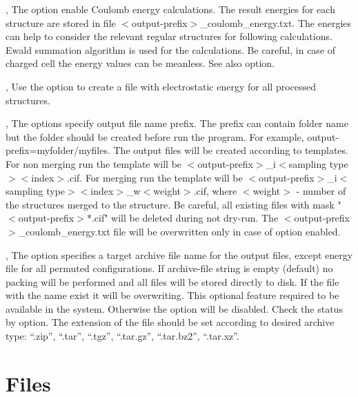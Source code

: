 \documentclass[a4paper,english]{article}
\begin{document}
\begin{Description}
\item[\Opt{-q}, \Opt{\Dd coulomb-energy}] 
      The option enable Coulomb energy calculations. The result energies for each structure are stored in file $<$output-prefix$>$\_coulomb\_energy.txt. The energies can help to consider the relevant regular structures for following calculations. Ewald summation algorithm is used for the calculations. Be careful, in case of charged cell the energy values can be meanless. See also  option.

\item[\Opt{-g}, \Opt{\Dd coulomb-store}]
      Use the option to create a file with electrostatic energy for all processed structures.

\item[\OptArg{-o }{output-prefix}, \OptArg{\Dd output-prefix=}{output-prefix}]
      The options specify output file name prefix. The prefix can contain folder name but the folder should be created before run the program. For example, \Dd output-prefix=myfolder/myfiles. The output files will be created according to templates. For non merging run the template will be $<$output-prefix$>$\_i$<$sampling type$><$index$>$.cif. For merging run the template will be $<$output-prefix$>$\_i$<$sampling type$><$index$>$\_w$<$weight$>$.cif, where $<$weight$>$ - number of the structures merged to the structure. Be careful, all existing files with mask "$<$output-prefix$>$*.cif" will be deleted during not dry-run. The $<$output-prefix$>$\_coulomb\_energy.txt file will be overwritten only in case of  option enabled.
      
\item[\OptArg{-a }{archive-file}, \OptArg{\Dd archive=}{archive-file}]
      The option specifies a target archive file name for the output files, except energy file for all permuted configurations. If archive-file string is empty (default) no packing will be performed and all files will be stored directly to disk. If the file with the name exist it will be overwriting. This optional feature required   to be available in the system. Otherwise the option will be disabled. Check the status by  option. The extension of the file should be set according to desired archive type: ``.zip'', ``.tar'', ``.tgz'', ``.tar.gz'', ``.tar.bz2'', ``.tar.xz''.

\end{Description}

\section{Files}
\end{document}
